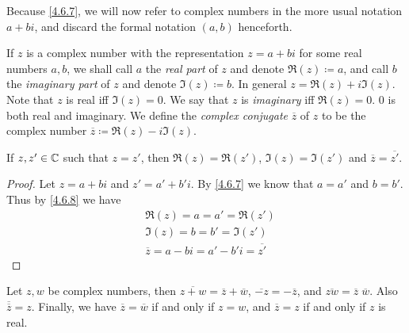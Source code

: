 \begin{note}
  Because \cref{4.6.7}, we will now refer to complex numbers in the more usual notation \(a + bi\), and discard the formal notation \((a, b)\) henceforth.
\end{note}

\begin{defn}\label{4.6.8}
  If \(z\) is a complex number with the representation \(z = a + bi\) for some real numbers \(a, b\), we shall call \(a\) the \emph{real part} of \(z\) and denote \(\Re(z) \coloneqq a\), and call \(b\) the \emph{imaginary part} of \(z\) and denote \(\Im(z) \coloneqq b\).
  In general \(z = \Re(z) + i \Im(z)\).
  Note that \(z\) is real iff \(\Im(z) = 0\).
  We say that \(z\) is \emph{imaginary} iff \(\Re(z) = 0\).
  \(0\) is both real and imaginary.
  We define the \emph{complex conjugate} \(\overline{z}\) of \(z\) to be the complex number \(\overline{z} \coloneqq \Re(z) - i \Im(z)\).
\end{defn}

\begin{ac}\label{ac:4.6.4}
  If \(z, z' \in \mathbb{C}\) such that \(z = z'\), then \(\Re(z) = \Re(z')\), \(\Im(z) = \Im(z')\) and \(\overline{z} = \overline{z'}\).
\end{ac}

\begin{proof}
  Let \(z = a + bi\) and \(z' = a' + b' i\).
  By \cref{4.6.7} we know that \(a = a'\) and \(b = b'\).
  Thus by \cref{4.6.8} we have
  \begin{align*}
     & \Re(z) = a = a' = \Re(z')                         \\
     & \Im(z) = b = b' = \Im(z')                         \\
     & \overline{z} = a - bi = a' - b' i = \overline{z'}
  \end{align*}
\end{proof}

\begin{lem}\label{4.6.9}
  Let \(z, w\) be complex numbers, then \(\overline{z + w} = \overline{z} + \overline{w}\), \(\overline{-z} = -\overline{z}\), and \(\overline{zw} = \overline{z} \; \overline{w}\).
  Also \(\overline{\overline{z}} = z\).
  Finally, we have \(\overline{z} = \overline{w}\) if and only if \(z = w\), and \(\overline{z} = z\) if and only if \(z\) is real.
\end{lem}

